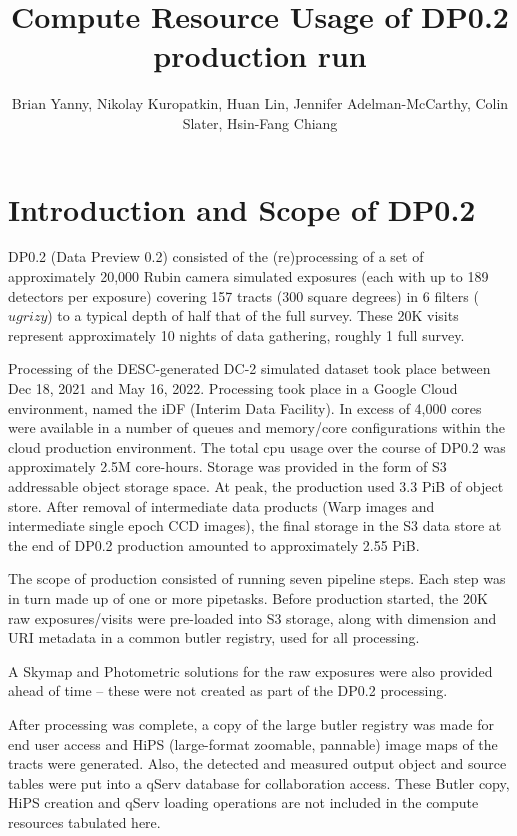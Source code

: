 \documentclass[OPS,authoryear,toc]{lsstdoc}
\title{Compute Resource Usage of DP0.2 production run}
\author{%
Brian Yanny, Nikolay Kuropatkin, Huan Lin, Jennifer Adelman-McCarthy, Colin Slater, Hsin-Fang Chiang
}
\date{\vcsDate}
\begin{document}
\maketitle


\section{Introduction and Scope of DP0.2}

DP0.2 (Data Preview 0.2) consisted of the (re)processing of a 
set of approximately 20,000 Rubin camera simulated exposures (each with up to
189 detectors per exposure) covering 157 tracts 
(300 square degrees) in 6 filters ($ugrizy$) to a typical 
depth of half that of the full survey.  These 20K visits represent 
approximately 10 nights of data gathering, roughly 1%
full survey.

Processing of the DESC-generated DC-2 simulated dataset \citep{DESC} took place between Dec 18, 2021 and May 16, 2022.  Processing took place in a Google Cloud environment, named the iDF (Interim Data Facility).  In excess of 4,000 cores
were available in a number of queues and memory/core configurations
within the cloud production environment.  The total cpu usage over the 
course of DP0.2 was approximately 2.5M core-hours. Storage was provided 
in the form of S3 addressable object storage space.  At peak, the production 
used 3.3 PiB of object store. After removal of intermediate data products
(Warp images and intermediate single epoch CCD images), the final storage
in the S3 data store at the end of DP0.2 production amounted to approximately
2.55 PiB. 

The scope of production consisted of running seven pipeline steps. Each step
was in turn made up of one or more pipetasks.   Before production
started, the 20K raw exposures/visits were pre-loaded into S3 storage, along
with dimension and URI metadata in a common butler registry, 
used for all processing.  

A Skymap and Photometric solutions for the 
raw exposures were also provided ahead of time -- these were not created
as part of the DP0.2 processing.

After processing was complete, a copy of the large butler registry was made
for end user access and HiPS (large-format zoomable, pannable) image maps 
of the tracts were generated. Also, the detected and measured output object 
and source tables were put into a qServ database for collaboration
access.  These Butler copy, HiPS creation and qServ loading operations
are not included in the compute resources tabulated here. 
\end{document}
